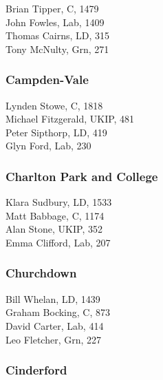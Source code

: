 \documentclass[a4paper,openany,10pt]{book}
\begin{document}


Brian Tipper, C, 1479\\
John Fowles, Lab, 1409\\
Thomas Cairns, LD, 315\\
Tony McNulty, Grn, 271\\


\subsubsection*{Campden-Vale}



Lynden Stowe, C, 1818\\
Michael Fitzgerald, UKIP, 481\\
Peter Sipthorp, LD, 419\\
Glyn Ford, Lab, 230\\


\subsubsection*{Charlton Park and College}



Klara Sudbury, LD, 1533\\
Matt Babbage, C, 1174\\
Alan Stone, UKIP, 352\\
Emma Clifford, Lab, 207\\


\subsubsection*{Churchdown}



Bill Whelan, LD, 1439\\
Graham Bocking, C, 873\\
David Carter, Lab, 414\\
Leo Fletcher, Grn, 227\\


\subsubsection*{Cinderford}

\end{document}
